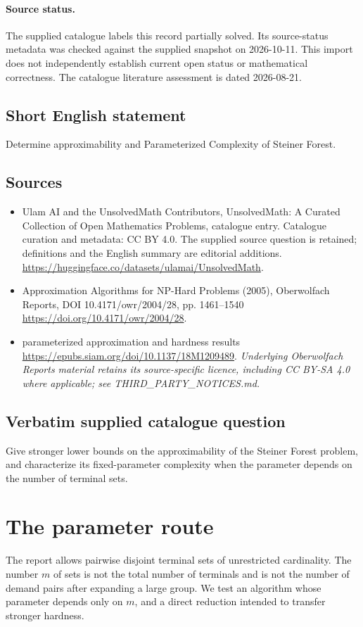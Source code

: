 \documentclass[11pt]{article}
\begin{document}
\paragraph{Source status.}
The supplied catalogue labels this record partially solved. Its source-status metadata was checked against the supplied snapshot on 2026-10-11. This import does not independently establish current open status or mathematical correctness. The catalogue literature assessment is dated 2026-08-21.
\subsection{Short English statement}
Determine approximability and Parameterized Complexity of Steiner Forest.
\subsection{Sources}
\begin{itemize}
\item[S1] Ulam AI and the UnsolvedMath Contributors, UnsolvedMath: A Curated Collection of Open Mathematics Problems, catalogue entry. Catalogue curation and metadata: CC BY 4.0. The supplied source question is retained; definitions and the English summary are editorial additions.
\url{https://huggingface.co/datasets/ulamai/UnsolvedMath}.
\item[S2] Approximation Algorithms for NP-Hard Problems (2005), Oberwolfach Reports, DOI 10.4171/owr/2004/28, pp. 1461--1540
\url{https://doi.org/10.4171/owr/2004/28}.
\item[S3] parameterized approximation and hardness results
\url{https://epubs.siam.org/doi/10.1137/18M1209489}.
\textit{Underlying Oberwolfach Reports material retains its source-specific licence, including CC BY-SA 4.0 where applicable; see THIRD\_PARTY\_NOTICES.md.}
\end{itemize}
\subsection{Verbatim supplied catalogue question}
Give stronger lower bounds on the approximability of the Steiner Forest problem, and characterize its fixed-parameter complexity when the parameter depends on the number of terminal sets.

\section{The parameter route}
The report allows pairwise disjoint terminal sets of unrestricted
cardinality. The number $m$ of sets is not the total number of
terminals and is not the number of demand pairs after expanding a
large group. We test an algorithm whose parameter depends only on
$m$, and a direct reduction intended to transfer stronger hardness.
\end{document}
